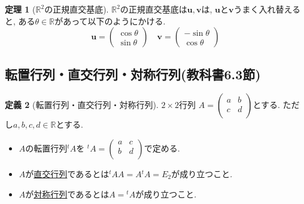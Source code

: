 \documentclass[dvipdfmx,a4paper,11pt]{article}
\newcommand{\R}{\mathbb{R}}
\theoremstyle{definition}
\newtheorem{thm}{定理}
\newtheorem{dfn}[thm]{定義}
\begin{document}
 
 
 \begin{tcolorbox}[
    colback = white,
    colframe = green!35!black,
    fonttitle = \bfseries,
    breakable = true]
    \begin{thm}[$\R^2$の正規直交基底]
$\R^2$の正規直交基底は$\bm{u},  \bm{v}$は, $\bm{u}$と$\bm{v}$うまく入れ替えると, ある$\theta \in \R$があって以下のようにかける. 
$$
\bm{u}
=
  \begin{pmatrix}
\cos \theta \\ \sin \theta
 \end{pmatrix}  
\quad
\bm{v}
=
\begin{pmatrix}
 -\sin \theta \\ \cos \theta
 \end{pmatrix}  
$$
\end{thm}
 \end{tcolorbox}
 
 \subsection{転置行列・直交行列・対称行列(教科書6.3節)}
 
 \begin{tcolorbox}[
    colback = white,
    colframe = green!35!black,
    fonttitle = \bfseries,
    breakable = true]
    \begin{dfn}[転置行列・直交行列・対称行列]
$2 \times 2$行列
$
A=\begin{pmatrix}
a& b \\
c& d \\
\end{pmatrix}
$とする. ただし$a,b,c,d \in \R$とする.
\begin{itemize}
\setlength{\parskip}{0cm}
 \setlength{\itemsep}{0pt} 
\item $A$の転置行列${}^t A$を
${}^t A =\begin{pmatrix}
a& c \\
b& d \\
\end{pmatrix}
$で定める.
\item $A$が\underline{直交行列}であるとは${}^t A A= A {}^t A = E_2$が成り立つこと.
\item $A$が\underline{対称行列}であるとは$ A= {}^t A$が成り立つこと.
\end{itemize}
\end{dfn}
 \end{tcolorbox}
 
\end{document}
